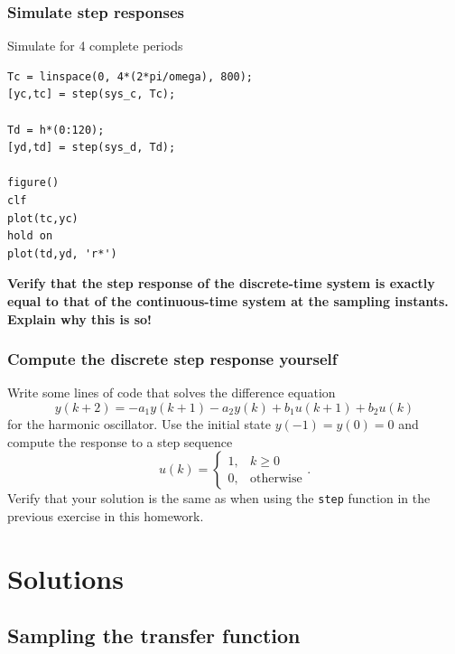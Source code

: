 \documentclass{scrartcl}
\begin{document}
\subsubsection*{Simulate step responses}
\label{sec-1-2-2}

Simulate for 4 complete periods 

\begin{verbatim}
Tc = linspace(0, 4*(2*pi/omega), 800);
[yc,tc] = step(sys_c, Tc);

Td = h*(0:120);
[yd,td] = step(sys_d, Td);

figure()
clf
plot(tc,yc)
hold on
plot(td,yd, 'r*')
\end{verbatim}

\textbf{Verify that the step response of the discrete-time system is exactly equal to that of the continuous-time system at the sampling instants. Explain why this is so!}
\subsubsection*{Compute the discrete step response yourself}
\label{sec-1-2-3}

    Write some lines of code that solves the difference equation
    \[ y(k+2) = -a_1y(k+1) - a_2y(k) + b_1u(k+1) + b_2u(k) \]
    for the harmonic oscillator. 
   Use the initial state \(y(-1)=y(0)=0\) and compute the response to a step sequence 
    \[ u(k) = \begin{cases} 1, & k \ge 0\\ 0, & \text{otherwise} \end{cases}.\]
    Verify that your solution is the same as when using the \texttt{step} function in the previous exercise in this homework.
 
\section*{Solutions}
\label{sec-2}
\subsection*{Sampling the transfer function}
\label{sec-2-1}
\end{document}
